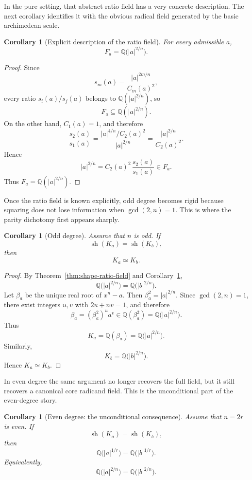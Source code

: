 \documentclass[11pt,letterpaper]{amsart}
\newcommand{\Q}{\mathbb{Q}}
\theoremstyle{plain}
\newtheorem{corollary}[theorem]{Corollary}
\theoremstyle{definition}
\begin{document}
In the pure setting, that abstract ratio field has a very concrete description. The next corollary identifies it with the obvious radical field generated by the basic archimedean scale.


\begin{corollary}[Explicit description of the ratio field]\label{cor:ratio-field-explicit}
For every admissible \(a\),
\[
F_a=\Q\bigl(|a|^{2/n}\bigr).
\]
\end{corollary}

\begin{proof}
Since
\[
s_m(a)=\frac{|a|^{2m/n}}{C_m(a)^2},
\]
every ratio \(s_i(a)/s_j(a)\) belongs to \(\Q(|a|^{2/n})\), so
\[
F_a\subseteq \Q(|a|^{2/n}).
\]
On the other hand, \(C_1(a)=1\), and therefore
\[
\frac{s_2(a)}{s_1(a)}
=
\frac{|a|^{4/n}/C_2(a)^2}{|a|^{2/n}}
=
\frac{|a|^{2/n}}{C_2(a)^2}.
\]
Hence
\[
|a|^{2/n}=C_2(a)^2\,\frac{s_2(a)}{s_1(a)}\in F_a.
\]
Thus \(F_a=\Q(|a|^{2/n})\).
\end{proof}

Once the ratio field is known explicitly, odd degree becomes rigid because squaring does not lose information when \(\gcd(2,n)=1\). This is where the parity dichotomy first appears sharply.


\begin{corollary}[Odd degree]\label{cor:odd-complete-short}
Assume that \(n\) is odd.
If
\[
\operatorname{sh}(K_a)=\operatorname{sh}(K_b),
\]
then
\[
K_a\simeq K_b.
\]
\end{corollary}

\begin{proof}
By Theorem~\ref{thm:shape-ratio-field} and Corollary~\ref{cor:ratio-field-explicit},
\[
\Q\bigl(|a|^{2/n}\bigr)=\Q\bigl(|b|^{2/n}\bigr).
\]
Let \(\beta_a\) be the unique real root of \(x^n-a\). Then \(\beta_a^2=|a|^{2/n}\).
Since \(\gcd(2,n)=1\), there exist integers \(u,v\) with \(2u+nv=1\), and therefore
\[
\beta_a=(\beta_a^2)^u a^v\in \Q(\beta_a^2)=\Q\bigl(|a|^{2/n}\bigr).
\]
Thus
\[
K_a=\Q(\beta_a)=\Q\bigl(|a|^{2/n}\bigr).
\]
Similarly,
\[
K_b=\Q\bigl(|b|^{2/n}\bigr).
\]
Hence \(K_a\simeq K_b\).
\end{proof}

In even degree the same argument no longer recovers the full field, but it still recovers a canonical core radicand field. This is the unconditional part of the even-degree story.


\begin{corollary}[Even degree: the unconditional consequence]\label{cor:even-core}
Assume that \(n=2r\) is even.
If
\[
\operatorname{sh}(K_a)=\operatorname{sh}(K_b),
\]
then
\[
\Q\bigl(|a|^{1/r}\bigr)=\Q\bigl(|b|^{1/r}\bigr).
\]
Equivalently,
\[
\Q\bigl(|a|^{2/n}\bigr)=\Q\bigl(|b|^{2/n}\bigr).
\]
\end{corollary}
\end{document}
